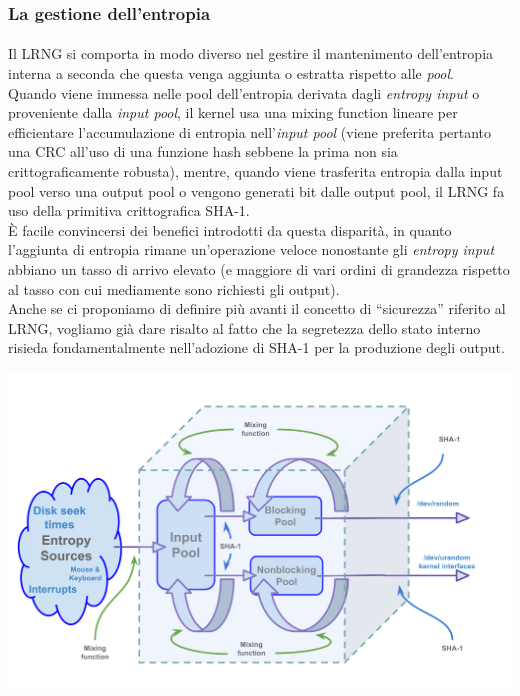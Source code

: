 \documentclass{article}
\begin{document}
 \subsubsection{La gestione dell'entropia}\label{aggiuntaentropia}
 \paragraph{}Il LRNG si comporta in modo diverso nel gestire
 il mantenimento dell'entropia interna a seconda che questa venga
 aggiunta o estratta rispetto alle \emph{pool}. \\
 Quando viene immessa nelle pool dell'entropia derivata dagli
 \emph{entropy input} o proveniente dalla \emph{input pool}, 
 il kernel usa una mixing function lineare per efficientare
 l'accumulazione di entropia nell'\emph{input pool} (viene preferita
 pertanto una CRC all'uso di una funzione hash sebbene la prima non sia
 crittograficamente robusta), mentre, quando viene trasferita entropia
 dalla input pool verso una output pool o vengono generati bit dalle output
 pool, il LRNG fa uso della primitiva crittografica SHA-1. \\
  È facile convincersi dei benefici introdotti da questa disparità, in quanto
 l'aggiunta di entropia rimane un'operazione veloce nonostante gli
 \emph{entropy input} abbiano un tasso di arrivo elevato (e maggiore di vari
 ordini di grandezza rispetto al tasso con cui mediamente sono richiesti gli
 output).\\ 
 Anche se ci proponiamo di definire più avanti il concetto di ``sicurezza''
 riferito al LRNG, vogliamo già dare risalto al fatto che la segretezza
 dello stato interno risieda fondamentalmente nell'adozione di SHA-1 per la
 produzione degli output.
 
   
  \centerline{\includegraphics[width=150mm]{img/Sha1.png}}
 
\end{document}
